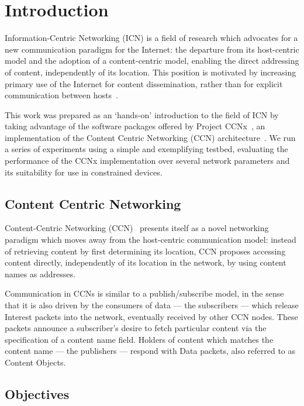 \chapter{Introduction}
\label{chap:intro}

Information-Centric Networking (ICN) is a field of research which advocates for 
a new communication paradigm for the Internet: the departure from 
its host-centric model and the adoption of a content-centric model, enabling 
the direct addressing of content, independently of its 
location. This position is motivated by increasing primary use of the Internet 
for content dissemination, rather than for explicit communication between 
hosts~\cite{Xylomenos2013}.\vertbreak 

This work was prepared as an `hands-on' introduction to 
the field of ICN by taking advantage of the software packages offered by 
Project CCNx~\cite{website:ccnx}, an implementation of the Content Centric 
Networking (CCN) architecture~\cite{Jacobson2009}. We 
run a series of experiments using a simple and exemplifying testbed, evaluating 
the performance of the CCNx implementation over several network parameters and 
its suitability for use in constrained devices.

\section{Content Centric Networking}
\label{sec:intro-ccnx}

Content-Centric Networking (CCN)~\cite{Jacobson2009} presents itself as a 
novel networking paradigm which moves away from the host-centric communication 
model: instead of retrieving content by first determining its location, CCN 
proposes accessing content directly, independently of its location in the 
network, by using content names as addresses.\vertbreak

Communication in CCNs is similar to a publish\slash subscribe model, in the 
sense that it is also driven by 
the consumers of data --- the subscribers --- which release Interest packets 
into the network, eventually received by other CCN nodes. These packets 
announce a subscriber's desire to fetch particular content via the specification 
of a content name field. Holders of content which matches the content name 
--- the publishers --- respond with Data packets, also referred to as Content 
Objects.

\section{Objectives}

